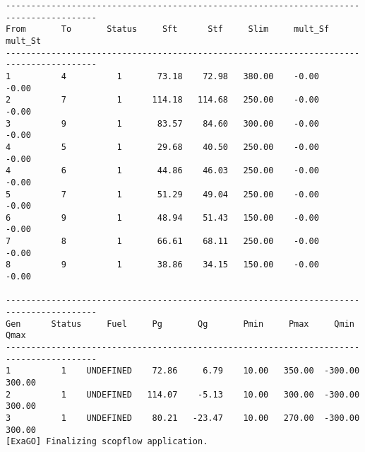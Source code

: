 \begin{lstlisting}
----------------------------------------------------------------------------------------
From       To       Status     Sft      Stf     Slim     mult_Sf  mult_St 
----------------------------------------------------------------------------------------
1          4          1       73.18    72.98   380.00    -0.00    -0.00
2          7          1      114.18   114.68   250.00    -0.00    -0.00
3          9          1       83.57    84.60   300.00    -0.00    -0.00
4          5          1       29.68    40.50   250.00    -0.00    -0.00
4          6          1       44.86    46.03   250.00    -0.00    -0.00
5          7          1       51.29    49.04   250.00    -0.00    -0.00
6          9          1       48.94    51.43   150.00    -0.00    -0.00
7          8          1       66.61    68.11   250.00    -0.00    -0.00
8          9          1       38.86    34.15   150.00    -0.00    -0.00

----------------------------------------------------------------------------------------
Gen      Status     Fuel     Pg       Qg       Pmin     Pmax     Qmin     Qmax  
----------------------------------------------------------------------------------------
1          1    UNDEFINED    72.86     6.79    10.00   350.00  -300.00   300.00
2          1    UNDEFINED   114.07    -5.13    10.00   300.00  -300.00   300.00
3          1    UNDEFINED    80.21   -23.47    10.00   270.00  -300.00   300.00
[ExaGO] Finalizing scopflow application.
\end{lstlisting}

